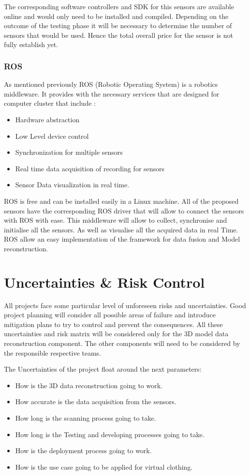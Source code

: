 \documentclass[12pt]{report}
\begin{document}
The corresponding software controllers and SDK for this sensors are available online and would only need to be installed and compiled. 
Depending on the outcome of the testing phase it will be necessary to determine the number of sensors that would be used. Hence the total overall price for the sensor is not fully establish yet. 

\subsubsection{ROS}
As mentioned previously ROS (Robotic Operating System) is a robotics middleware. It provides with the necessary services that are designed for computer cluster that include : 
\begin{itemize}
  \item Hardware abstraction
  \item Low Level device control
  \item Synchronization for multiple sensors
  \item Real time data acquisition of recording for sensors
  \item Sensor Data visualization in real time.
\end{itemize}

ROS is free and can be installed easily in a Linux machine. All of the proposed sensors have the corresponding ROS driver that will allow to connect the sensors with ROS with ease. 
This middleware will allow to collect, synchronise and initialise all the sensors. As well as visualise all the acquired data in real Time. ROS allow an easy implementation of the framework for data fusion and Model reconstruction. 

\section{Uncertainties \& Risk Control}
All projects face some particular level of unforeseen risks and uncertainties. Good project planning will consider all possible areas of failure  and introduce mitigation plans to try to control and prevent the consequences.  
All these uncertainties and risk matrix will be considered only  for the 3D model data reconstruction component. The other components will need to be considered by the responsible respective teams. 

\newpage
The Uncertainties of the project float around the next parameters:
\begin{itemize}
  \item How is the 3D data reconstruction going to work.
  \item How accurate is the data acquisition from the sensors.
  \item How long is the scanning process going to take. 
  \item How long is the Testing and developing processes going to take. 
  \item How is the deployment process going to work.
  \item How is the use case going to be applied for virtual clothing.
\end{itemize}
\end{document}
